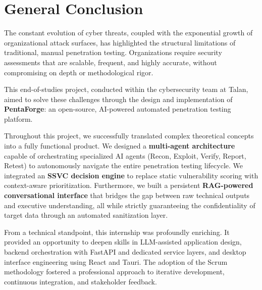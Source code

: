 \documentclass[12pt,a4paper]{report}
\begin{document}
\pagestyle{fancy}

\newpage
\thispagestyle{fancy}
\chapter*{General Conclusion}

The constant evolution of cyber threats, coupled with the exponential growth of organizational 
attack surfaces, has highlighted the structural limitations of traditional, manual 
penetration testing. Organizations require security assessments that are scalable, 
frequent, and highly accurate, without compromising on depth or methodological rigor.

This end-of-studies project, conducted within the cybersecurity team at Talan, aimed to 
solve these challenges through the design and implementation of \textbf{PentaForge}: an 
open-source, AI-powered automated penetration testing platform. 

Throughout this project, we successfully translated complex theoretical concepts into a 
fully functional product. We designed a \textbf{multi-agent architecture} capable of 
orchestrating specialized AI agents (Recon, Exploit, Verify, Report, Retest) to autonomously 
navigate the entire penetration testing lifecycle. We integrated an \textbf{SSVC decision engine} 
to replace static vulnerability scoring with context-aware prioritization. Furthermore, 
we built a persistent \textbf{RAG-powered conversational interface} that bridges the gap 
between raw technical outputs and executive understanding, all while strictly guaranteeing 
the confidentiality of target data through an automated sanitization layer.

From a technical standpoint, this internship was profoundly enriching. It provided an
opportunity to deepen skills in LLM-assisted application design, backend
orchestration with FastAPI and dedicated service layers, and desktop interface
engineering using React and Tauri. The adoption of the Scrum methodology fostered a
professional approach to iterative development, continuous integration, and
stakeholder feedback.
\end{document}
